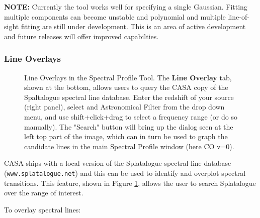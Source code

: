 {\bf NOTE:} Currently the tool works well for specifying a single Gaussian. Fitting multiple components can become unstable and
polynomial and multiple line-of-sight fitting are still under development. This is an area of active development and future releases 
will offer improved capabilties.

\subsubsection{Line Overlays}
\label{section:display.image.specprof.lineoverlay}

\begin{figure}[h!]
\begin{center}
\caption{\label{fig:viewer_lineoverlay} Line Overlays in the Spectral Profile Tool. The {\bf Line Overlay} tab, shown at the bottom,
allows users to query the CASA copy of the Spaltalogue spectral line database. Enter the redshift of your source (right panel),
select and Astronomical Filter from the drop down menu, and use shift+click+drag to select a frequency range (or do so manually). 
The "Search" button will bring up the dialog seen at the left top part of the image, which can in turn be used to graph the candidate
lines in the main Spectral Profile window (here CO v=0).}
\hrulefill
\end{center}
\end{figure}

CASA ships with a local version of the Splatalogue spectral line database ({\tt www.splatalogue.net}) and this can be used to identify and overplot 
spectral transitions. This feature, shown in Figure \ref{fig:viewer_lineoverlay}, allows the user to search Splatalogue
over the range of interest. 

To overlay spectral lines:

